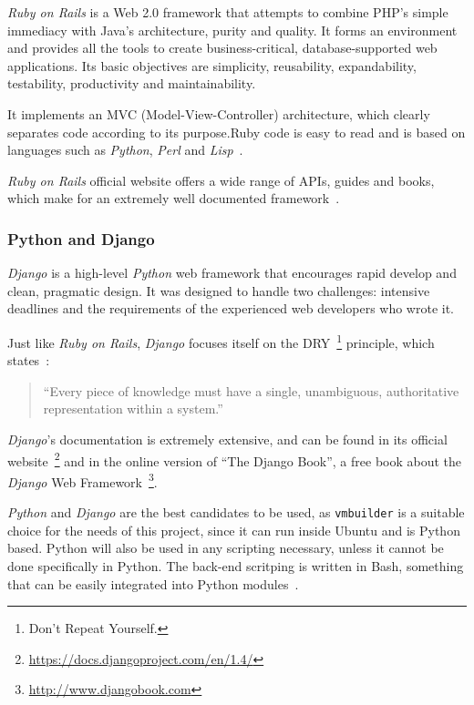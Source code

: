 \textit{Ruby on Rails} is a Web 2.0 framework that attempts to combine PHP’s simple immediacy with Java’s architecture, purity and quality. It forms an environment and provides all the tools to create business-critical, database-supported web applications. Its basic objectives are simplicity, reusability, expandability, testability, productivity and maintainability.

It implements an MVC (Model-View-Controller) architecture, which clearly separates code according to its purpose.Ruby code is easy to read and is based on languages such as \textit{Python}, \textit{Perl} and \textit{Lisp}~\cite{ror}.

\textit{Ruby on Rails} official website offers a wide range of APIs, guides and books, which make for an extremely well documented framework~\cite{rubyonrails}.

\subsubsection{Python and Django}\label{python}

\textit{Django} is a high-level \textit{Python} web framework that encourages rapid develop and clean, pragmatic design. It was designed to handle two challenges: intensive deadlines and the requirements of the experienced web developers who wrote it.

Just like \textit{Ruby on Rails}, \textit{Django} focuses itself on the DRY~\footnote{Don't Repeat Yourself.} principle, which states~\cite{c2}:
\begin{quote}
``Every piece of knowledge must have a single, unambiguous, authoritative representation within a system.''
\end{quote}
\textit{Django}’s documentation is extremely extensive, and can be found in its official website~\footnote{\url{https://docs.djangoproject.com/en/1.4/}} and in the online version of ``The Django Book'', a free book about the \textit{Django} Web Framework~\footnote{\url{http://www.djangobook.com}}.

\textit{Python} and \textit{Django} are the best candidates to be used, as \texttt{vmbuilder} is a suitable choice for the needs of this project, since it can run inside Ubuntu and is Python based. Python will also be used in any scripting necessary, unless it cannot be done specifically in
Python. The back-end scritping is written in Bash, something that can be easily integrated into Python modules~\cite{stackoverflow-python-bash}.

